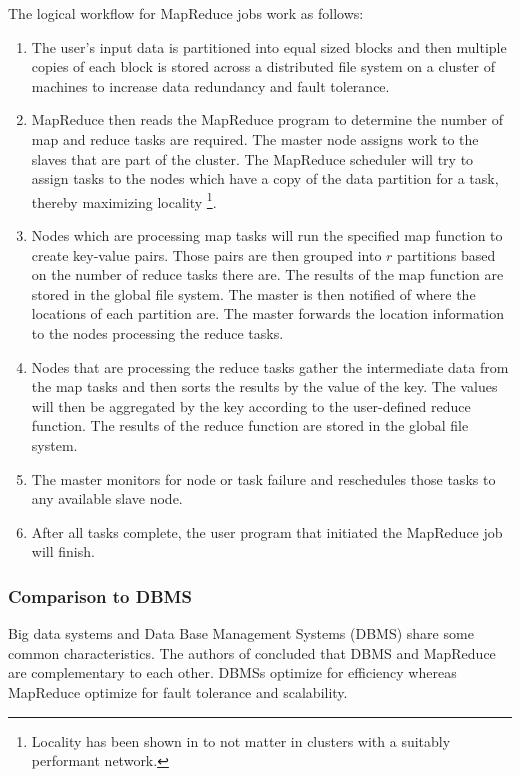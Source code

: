 \documentclass[12pt]{article}
\begin{document}
The logical workflow for MapReduce jobs work as follows:
\begin{enumerate}
    \item The user's input data is partitioned into equal sized blocks and then multiple copies of each block is stored across a distributed file system on a cluster of machines to increase data redundancy and fault tolerance.
    \item MapReduce then reads the MapReduce program to determine the number of map and reduce tasks are required. The master node assigns work to the slaves that are part of the cluster. The MapReduce scheduler will try to assign tasks to the nodes which have a copy of the data partition for a task, thereby maximizing locality \footnote{Locality has been shown in \cite{ousterhout2015making} to not matter in clusters with a suitably performant network.}.
    \item Nodes which are processing map tasks will run the specified map function to create key-value pairs. Those pairs are then grouped into $r$ partitions based on the number of reduce tasks there are. The results of the map function are stored in the global file system. The master is then notified of where the locations of each partition are. The master forwards the location information to the nodes processing the reduce tasks.
    \item Nodes that are processing the reduce tasks gather the intermediate data from the map tasks and then sorts the results by the value of the key. The values will then be aggregated by the key according to the user-defined reduce function. The results of the reduce function are stored in the global file system.
    \item The master monitors for node or task failure and reschedules those tasks to any available slave node.
    \item After all tasks complete, the user program that initiated the MapReduce job will finish.
\end{enumerate}


\subsubsection{Comparison to DBMS}

Big data systems and Data Base Management Systems (DBMS) share some common characteristics. The authors of \cite{stonebreaker2010mapreduce} concluded that DBMS and MapReduce are complementary to each other. DBMSs optimize for efficiency whereas MapReduce optimize for fault tolerance and scalability.
\end{document}
